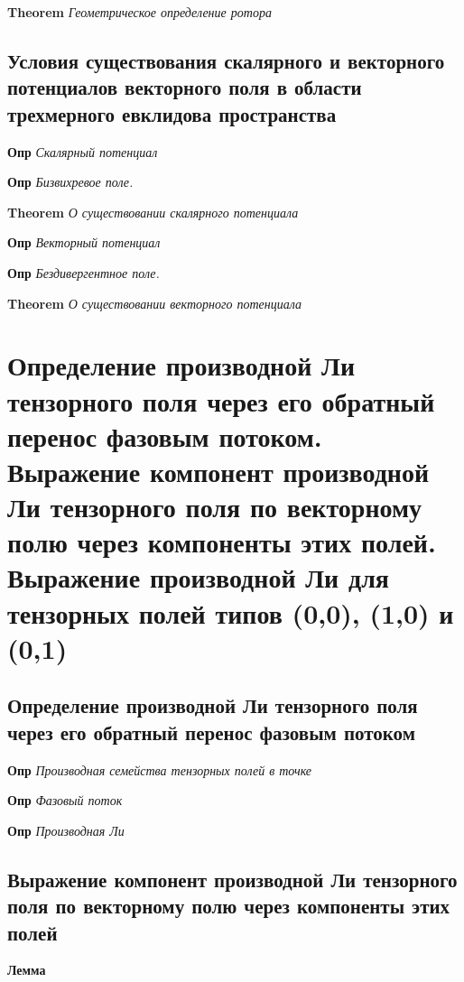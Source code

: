 \documentclass[a4paper, 14pt]{article}
\begin{document}
    \textbf{Theorem} \textit{Геометрическое определение ротора}
    
    \subsection{Условия существования скалярного и векторного потенциалов векторного поля в области трехмерного
    евклидова пространства}
    
    \textbf{Опр} \textit{Скалярный потенциал}
    
    \textbf{Опр} \textit{Бизвихревое поле.}
    
    \textbf{Theorem} \textit{О существовании скалярного потенциала}
    
    \textbf{Опр} \textit{Векторный потенциал}
    
    \textbf{Опр} \textit{Бездивергентное поле.}
    
    \textbf{Theorem} \textit{О существовании векторного потенциала}
    
    \section{Определение производной Ли тензорного поля через его обратный перенос фазовым потоком.
    Выражение компонент производной Ли тензорного поля по векторному полю через компоненты этих полей.
    Выражение производной Ли для тензорных полей типов (0,0), (1,0) и (0,1)}
    
    \subsection{Определение производной Ли тензорного поля через его обратный перенос фазовым потоком}
    
    \textbf{Опр} \textit{Производная семейства тензорных полей в точке}
    
    \textbf{Опр} \textit{Фазовый поток}
    
    \textbf{Опр} \textit{Производная Ли}
    
    \subsection{Выражение компонент производной Ли тензорного поля по векторному полю через компоненты этих полей}
    
    \textbf{Лемма}
    
\end{document}
